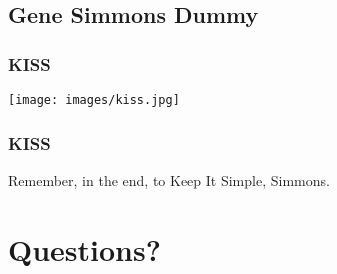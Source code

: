 \documentclass{beamer}
\begin{document}
\subsection{Gene Simmons Dummy}

\begin{frame}
  \frametitle{KISS}
    \texttt{[image: images/kiss.jpg]}
\end{frame}

\begin{frame}
  \frametitle{KISS}
  Remember, in the end, to Keep It Simple, Simmons.
\end{frame}

\section{Questions?}
\end{document}
